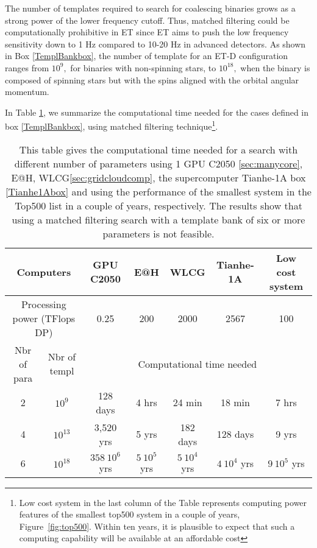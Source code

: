 The number of templates required to search for coalescing binaries 
grows as a strong power of the lower frequency cutoff. Thus, matched
filtering could be computationally prohibitive in ET since ET aims to
push the low frequency sensitivity down to 1 Hz compared to 10-20 Hz 
in advanced detectors. As shown in Box \ref{TemplBankbox}, the 
number of template for an ET-D configuration ranges from $10^9,$ for 
binaries with non-spinning stars, to $10^{18},$ when the binary is composed
of spinning stars but with the spins aligned with the orbital angular momentum.

In Table \ref{comp.power}, we summarize the computational time needed for 
the cases defined in box \ref{TemplBankbox}, using matched filtering
technique\footnote{Low cost system in the last column of the Table 
represents computing power features of the smallest top500 system in 
a couple of years, Figure~\ref{fig:top500}. Within ten years, it is  
plausible to expect that such a computing capability will be available 
at an affordable cost}.
\begin{table}[h]
\begin{center}
\begin{tabular}{|c|c||c|c|c|c|c|} 
\hline

\multicolumn{2}{|c||}{Computers} &  GPU C2050 & E@H & WLCG &  Tianhe-1A & Low cost system\\ 
\hline
\multicolumn{2}{|c||}{Processing power (TFlops DP) } & 0.25 & 200 & 2000 &  2567 & 100 \\ 
\hline
 Nbr of para  & Nbr of templ   &  \multicolumn{5}{|c|}{Computational time needed} \\
 \hline
  2   &  $10^9$       & 128 days & 4 hrs  & 24 min   &  18 min  & 7 hrs   \\
 \hline
  4   &  $10^{13}$  & 3,520 yrs & 5 yrs   & 182 days   &  128 days    &  9 yrs  \\ 
\hline
   6  &  $10^{18}$  & $358~10^6$ yrs &   $5~10^5$ yrs & $5~10^4$ yrs   & $4~10^4$ yrs  &  $9~10^5$ yrs   \\
\hline
\end{tabular}
\end{center}
\caption{This table gives the computational time needed for a search 
with different number of parameters using 1 GPU C2050 \ref{sec:manycore}, 
E@H, WLCG\ref{sec:gridcloudcomp}, the supercomputer Tianhe-1A 
box \ref{Tianhe1Abox} and using the performance of the smallest system 
in the Top500 list in a couple of years, respectively. The results show 
that using a matched filtering search with a template bank of six or more 
parameters is not feasible.}
\label{comp.power}
\end{table}


